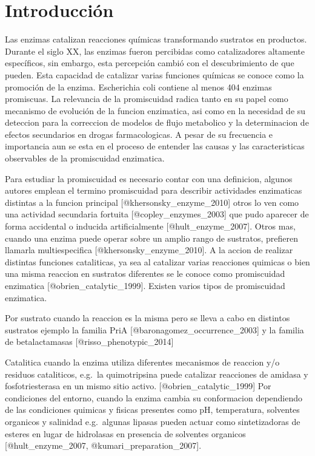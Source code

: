 \documentclass[]{article}
\title{}
\author{}
\date{}
\begin{document}
\section*{Introducción}\label{introduccion}

Las enzimas catalizan reacciones químicas transformando sustratos en
productos. Durante el siglo XX, las enzimas fueron percibidas como
catalizadores altamente específicos, sin embargo, esta percepción cambió
con el descubrimiento de que pueden. Esta capacidad de catalizar varias
funciones químicas se conoce como la promoción de la enzima. Escherichia
coli contiene al menos 404 enzimas promiscuas. La relevancia de la
promiscuidad radica tanto en su papel como mecanismo de evolución de la
funcion enzimatica, asi como en la necesidad de su deteccion para la
correccion de modelos de flujo metabolico y la determinacion de efectos
secundarios en drogas farmacologicas. A pesar de su frecuencia e
importancia aun se esta en el proceso de entender las causas y las
caracteristicas observables de la promiscuidad enzimatica.

Para estudiar la promiscuidad es necesario contar con una definicion,
algunos autores emplean el termino promiscuidad para describir
actividades enzimaticas distintas a la funcion principal
{[}@khersonsky\_enzyme\_2010{]} otros lo ven como una actividad
secundaria fortuita {[}@copley\_enzymes\_2003{]} que pudo aparecer de
forma accidental o inducida artificialmente {[}@hult\_enzyme\_2007{]}.
Otros mas, cuando una enzima puede operar sobre un amplio rango de
sustratos, prefieren llamarla multiespecifica
{[}@khersonsky\_enzyme\_2010{]}. A la accion de realizar distintas
funciones cataliticas, ya sea al catalizar varias reacciones quimicas o
bien una misma reaccion en sustratos diferentes se le conoce como
promiscuidad enzimatica {[}@obrien\_catalytic\_1999{]}. Existen varios
tipos de promiscuidad enzimatica.

Por sustrato cuando la reaccion es la misma pero se lleva a cabo en
distintos sustratos ejemplo la familia PriA
{[}@baronagomez\_occurrence\_2003{]} y la familia de betalactamasas
{[}@risso\_phenotypic\_2014{]}

Catalitica cuando la enzima utiliza diferentes mecanismos de reaccion
y/o residuos cataliticos, e.g.~la quimotripsina puede catalizar
reacciones de amidasa y fosfotriesterasa en un mismo sitio activo.
{[}@obrien\_catalytic\_1999{]} Por condiciones del entorno, cuando la
enzima cambia su conformacion dependiendo de las condiciones quimicas y
fisicas presentes como pH, temperatura, solventes organicos y salinidad
e.g.~algunas lipasas pueden actuar como sintetizadoras de esteres en
lugar de hidrolasas en presencia de solventes organicos
{[}@hult\_enzyme\_2007, @kumari\_preparation\_2007{]}.
\end{document}
